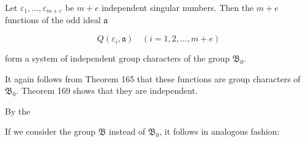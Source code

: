 Let $\varepsilon_1, \ldots, \varepsilon_{m+e}$ be $m+e$ independent singular numbers. Then the $m+e$ functions of the odd ideal $\mathfrak{a}$

$$Q(\varepsilon_i, \mathfrak{a}) \quad (i = 1, 2, \ldots, m+e)$$

form a system of independent group characters of the group $\mathfrak{B}_0$.

It again follows from Theorem 165 that these functions are group characters of $\mathfrak{B}_0$. Theorem 169 shows that they are independent.

By the

If we consider the group $\mathfrak{B}$ instead of $\mathfrak{B}_0$, it follows in analogous fashion:
